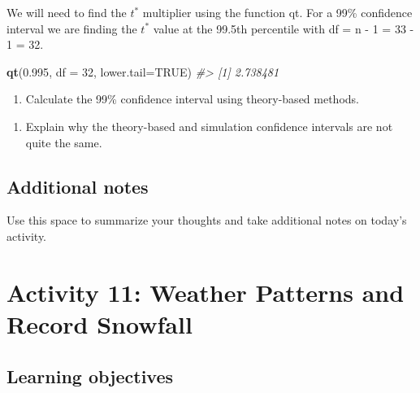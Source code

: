 \documentclass[
]{report}
\newenvironment{Shaded}{\begin{snugshade}}{\end{snugshade}}
\newcommand{\CommentTok}[1]{\textcolor[rgb]{0.56,0.35,0.01}{\textit{#1}}}
\newcommand{\DataTypeTok}[1]{\textcolor[rgb]{0.13,0.29,0.53}{#1}}
\newcommand{\DecValTok}[1]{\textcolor[rgb]{0.00,0.00,0.81}{#1}}
\newcommand{\FloatTok}[1]{\textcolor[rgb]{0.00,0.00,0.81}{#1}}
\newcommand{\KeywordTok}[1]{\textcolor[rgb]{0.13,0.29,0.53}{\textbf{#1}}}
\newcommand{\NormalTok}[1]{#1}
\newcommand{\OtherTok}[1]{\textcolor[rgb]{0.56,0.35,0.01}{#1}}
\providecommand{\tightlist}{%
  \setlength{\itemsep}{0pt}\setlength{\parskip}{0pt}}
\begin{document}
We will need to find the \(t^*\) multiplier using the function qt. For a 99\% confidence interval we are finding the \(t^*\) value at the 99.5th percentile with df = n - 1 = 33 - 1 = 32.

\begin{Shaded}
\begin{Highlighting}[]
\KeywordTok{qt}\NormalTok{(}\FloatTok{0.995}\NormalTok{, }\DataTypeTok{df =} \DecValTok{32}\NormalTok{, }\DataTypeTok{lower.tail=}\OtherTok{TRUE}\NormalTok{)}
\CommentTok{\#\textgreater{} [1] 2.738481}
\end{Highlighting}
\end{Shaded}

\begin{enumerate}
\def\labelenumi{\arabic{enumi}.}
\setcounter{enumi}{4}
\tightlist
\item
  Calculate the 99\% confidence interval using theory-based methods.
\end{enumerate}

\vspace{1in}

\begin{enumerate}
\def\labelenumi{\arabic{enumi}.}
\setcounter{enumi}{5}
\tightlist
\item
  Explain why the theory-based and simulation confidence intervals are not quite the same.
\end{enumerate}

\vspace{1in}

\hypertarget{additional-notes}{%
\section{Additional notes}\label{additional-notes}}

Use this space to summarize your thoughts and take additional notes on today's activity.

\hypertarget{activity-11-weather-patterns-and-record-snowfall}{%
\chapter{Activity 11: Weather Patterns and Record Snowfall}\label{activity-11-weather-patterns-and-record-snowfall}}

\newcommand\latexcode[1]{#1}

\hypertarget{learning-objectives}{%
\section{Learning objectives}\label{learning-objectives}}
\end{document}
